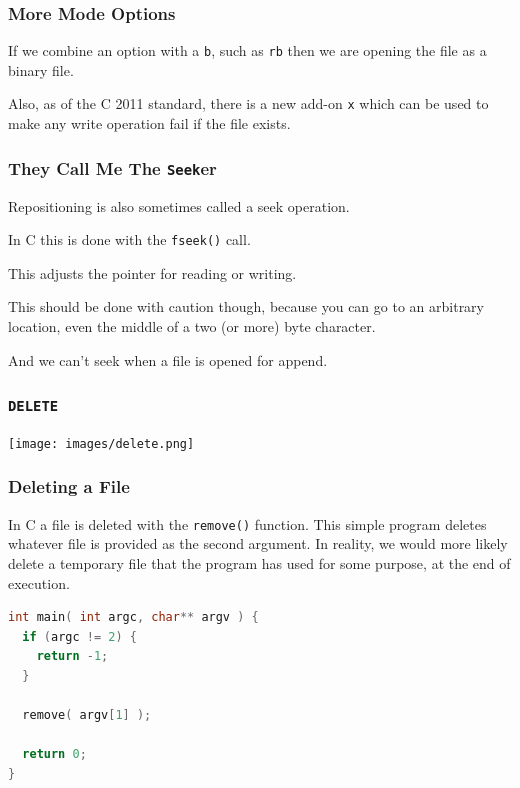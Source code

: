 \begin{frame}
	\frametitle{More Mode Options}

	If we combine an option with a \texttt{b}, such as \texttt{rb} then we are opening the file as a binary file.

	Also, as of the C 2011 standard, there is a new add-on \texttt{x} which can be used to make any write operation fail if the file exists.

\end{frame}

\begin{frame}
	\frametitle{They Call Me The \texttt{Seek}er}

	Repositioning is also sometimes called a seek operation.

	In C this is done with the \texttt{fseek()} call.

	This adjusts the pointer for reading or writing.

	This should be done with caution though, because you can go to an arbitrary location, even the middle of a two (or more) byte character.

	And we can't seek when a file is opened for append.

\end{frame}


\begin{frame}
	\frametitle{\texttt{DELETE}}

	\begin{center}
		\texttt{[image: images/delete.png]}
	\end{center}

\end{frame}


\begin{frame}[fragile]
	\frametitle{Deleting a File}

	In C a file is deleted with the \texttt{remove()} function. This simple program deletes whatever file is provided as the second argument. In reality, we would more likely delete a temporary file that the program has used for some purpose, at the end of execution.

	\begin{lstlisting}[language=C]
int main( int argc, char** argv ) {
  if (argc != 2) {
    return -1;
  }
  
  remove( argv[1] );

  return 0;
}    
\end{lstlisting}

\end{frame}





